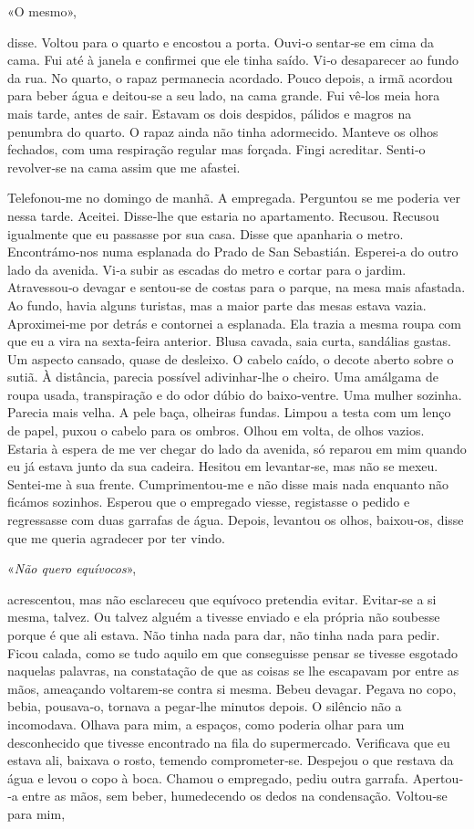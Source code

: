 «O mesmo»,

disse. Voltou para o quarto e encostou a porta. Ouvi­‑o sentar­‑se em
cima da cama. Fui até à janela e confirmei que ele tinha saído. Vi­‑o
desaparecer ao fundo da rua. No quarto, o rapaz permanecia acordado.
Pouco depois, a irmã acordou para beber água e deitou­‑se a seu lado, na
cama grande. Fui vê­‑los meia hora mais tarde, antes de sair. Estavam os
dois despidos, pálidos e magros na penumbra do quarto. O rapaz ainda não
tinha adormecido. Manteve os olhos fechados, com uma respiração regular
mas forçada. Fingi acreditar. Senti­‑o revolver­‑se na cama assim que me
afastei.

Telefonou­‑me no domingo de manhã. A empregada. Perguntou se me poderia
ver nessa tarde. Aceitei. Disse­‑lhe que estaria no apartamento.
Recusou. Recusou igualmente que eu passasse por sua casa. Disse que
apanharia o metro. Encontrámo­‑nos numa esplanada do Prado de San
Sebastián. Esperei­‑a do outro lado da avenida. Vi­‑a subir as escadas
do metro e cortar para o jardim. Atravessou­‑o devagar e sentou­‑se de
costas para o parque, na mesa mais afastada. Ao fundo, havia alguns
turistas, mas a maior parte das mesas estava vazia. Aproximei­‑me por
detrás e contornei a esplanada. Ela trazia a mesma roupa com que eu a
vira na sexta­‑feira anterior. Blusa cavada, saia curta, sandálias
gastas. Um aspecto cansado, quase de desleixo. O cabelo caído, o decote
aberto sobre o sutiã. À distância, parecia possível adivinhar­‑lhe o
cheiro. Uma amálgama de roupa usada, transpiração e do odor dúbio do
baixo­‑ventre. Uma mulher sozinha. Parecia mais velha. A pele baça,
olheiras fundas. Limpou a testa com um lenço de papel, puxou o cabelo
para os ombros. Olhou em volta, de olhos vazios. Estaria à espera de me
ver chegar do lado da avenida, só reparou em mim quando eu já estava
junto da sua cadeira. Hesitou em levantar­‑se, mas não se mexeu.
Sentei­‑me à sua frente. Cumprimentou­‑me e não disse mais nada enquanto
não ficámos sozinhos. Esperou que o empregado viesse, registasse o
pedido e regressasse com duas garrafas de água. Depois, levantou os
olhos, baixou­‑os, disse que me queria agradecer por ter vindo.

«\emph{Não quero equívocos}»,

acrescentou, mas não esclareceu que equívoco pretendia evitar.
Evitar­‑se a si mesma, talvez. Ou talvez alguém a tivesse enviado e ela
própria não soubesse porque é que ali estava. Não tinha nada para dar,
não tinha nada para pedir. Ficou calada, como se tudo aquilo em que
conseguisse pensar se tivesse esgotado naquelas palavras, na constatação
de que as coisas se lhe escapavam por entre as mãos, ameaçando
voltarem­‑se contra si mesma. Bebeu devagar. Pegava no copo, bebia,
pousava­‑o, tornava a pegar­‑lhe minutos depois. O silêncio não a
incomodava. Olhava para mim, a espaços, como poderia olhar para um
desconhecido que tivesse encontrado na fila do supermercado. Verificava
que eu estava ali, baixava o rosto, temendo comprometer­‑se. Despejou o
que restava da água e levou o copo à boca. Chamou o empregado, pediu
outra garrafa. Apertou­‑a entre as mãos, sem beber, humedecendo os dedos
na condensação. Voltou­‑se para mim,

